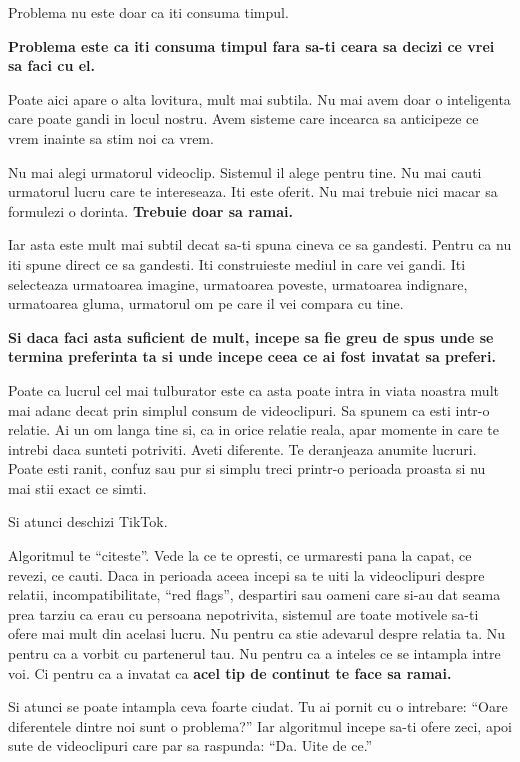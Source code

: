Problema nu este doar ca iti consuma timpul.

\textbf{Problema este ca iti consuma timpul fara sa-ti ceara sa decizi
ce vrei sa faci cu el.}

Poate aici apare o alta lovitura, mult mai subtila. Nu mai avem doar o
inteligenta care poate gandi in locul nostru. Avem sisteme care incearca
sa anticipeze ce vrem inainte sa stim noi ca vrem.

Nu mai alegi urmatorul videoclip. Sistemul il alege pentru tine. Nu mai
cauti urmatorul lucru care te intereseaza. Iti este oferit. Nu mai
trebuie nici macar sa formulezi o dorinta. \textbf{Trebuie doar sa
ramai.}

Iar asta este mult mai subtil decat sa-ti spuna cineva ce sa gandesti.
Pentru ca nu iti spune direct ce sa gandesti. Iti construieste mediul in
care vei gandi. Iti selecteaza urmatoarea imagine, urmatoarea poveste,
urmatoarea indignare, urmatoarea gluma, urmatorul om pe care il vei
compara cu tine.

\textbf{Si daca faci asta suficient de mult, incepe sa fie greu de spus
unde se termina preferinta ta si unde incepe ceea ce ai fost invatat sa
preferi.}

Poate ca lucrul cel mai tulburator este ca asta poate intra in viata
noastra mult mai adanc decat prin simplul consum de videoclipuri. Sa
spunem ca esti intr-o relatie. Ai un om langa tine si, ca in orice
relatie reala, apar momente in care te intrebi daca sunteti potriviti.
Aveti diferente. Te deranjeaza anumite lucruri. Poate esti ranit,
confuz sau pur si simplu treci printr-o perioada proasta si nu mai stii
exact ce simti.

Si atunci deschizi TikTok.

Algoritmul te ``citeste''. Vede la ce te opresti, ce urmaresti pana la
capat, ce revezi, ce cauti. Daca in perioada aceea incepi sa te uiti la
videoclipuri despre relatii, incompatibilitate, ``red flags'',
despartiri sau oameni care si-au dat seama prea tarziu ca erau cu
persoana nepotrivita, sistemul are toate motivele sa-ti ofere mai mult
din acelasi lucru. Nu pentru ca stie adevarul despre relatia ta. Nu
pentru ca a vorbit cu partenerul tau. Nu pentru ca a inteles ce se
intampla intre voi. Ci pentru ca a invatat ca \textbf{acel tip de
continut te face sa ramai.}

Si atunci se poate intampla ceva foarte ciudat. Tu ai pornit cu o
intrebare: ``Oare diferentele dintre noi sunt o problema?'' Iar
algoritmul incepe sa-ti ofere zeci, apoi sute de videoclipuri care par
sa raspunda: ``Da. Uite de ce.''

